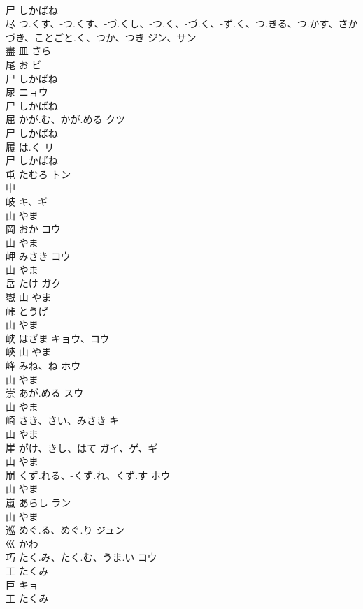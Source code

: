 \documentclass[8pt]{extreport}
\begin{document}
\begin{CJK}{UTF8}{min}
\\	尸		しかばね		
\\	尽	つ.くす、-つ.くす、-づ.くし、-つ.く、-づ.く、-ず.く、つ.きる、つ.かす、さかづき、ことごと.く、つか、つき	ジン、サン	
\\	盡	皿		さら		
\\	尾	お	ビ	
\\	尸		しかばね		
\\	尿		ニョウ	
\\	尸		しかばね		
\\	屈	かが.む、かが.める	クツ	
\\	尸		しかばね		
\\	履	は.く	リ	
\\	尸		しかばね		
\\	屯	たむろ	トン	
\\	屮				
\\	岐		キ、ギ	
\\	山		やま		
\\	岡	おか	コウ	
\\	山		やま		
\\	岬	みさき	コウ	
\\	山		やま		
\\	岳	たけ	ガク	
\\	嶽	山		やま		
\\	峠	とうげ		
\\	山		やま		
\\	峡	はざま	キョウ、コウ	
\\	峽	山		やま		
\\	峰	みね、ね	ホウ	
\\	山		やま		
\\	崇	あが.める	スウ	
\\	山		やま		
\\	崎	さき、さい、みさき	キ	
\\	山		やま		
\\	崖	がけ、きし、はて	ガイ、ゲ、ギ	
\\	山		やま		
\\	崩	くず.れる、-くず.れ、くず.す	ホウ	
\\	山		やま		
\\	嵐	あらし	ラン	
\\	山		やま		
\\	巡	めぐ.る、めぐ.り	ジュン	
\\	巛		かわ		
\\	巧	たく.み、たく.む、うま.い	コウ	
\\	工		たくみ		
\\	巨		キョ	
\\	工		たくみ		

\end{CJK}
\end{document}
